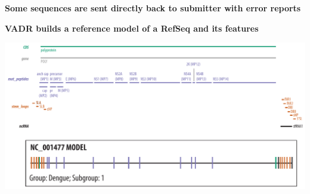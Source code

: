 \documentclass[landscape]{slides}
\begin{document}
\begin{slide}
\begin{center}
\large{\textbf{Some sequences are sent directly back to submitter with
    error reports}}
\end{center}


\vfill
\end{slide}
\begin{slide}
\begin{center}
\large{\textbf{VADR builds a reference model of a RefSeq and its features}}
\end{center}

\includegraphics[width=10.5in]{figs/dengue-features}

\vfill
\end{slide}
\end{document}
